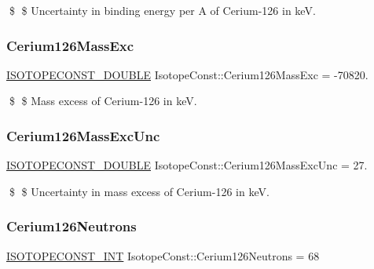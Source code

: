 \$ \$ Uncertainty in binding energy per A of Cerium-\/126 in keV. \mbox{\label{group___isotope_const-_cerium-_ce126_ga34e0b01c910c09c519913cc8c7d53665}} 
\subsubsection{\texorpdfstring{Cerium126\+Mass\+Exc}{Cerium126MassExc}}
{\footnotesize\ttfamily \mbox{\hyperlink{group___isotope_const-_macros_ga8f45a7272ce02c0b4c65c44636ed719a}{I\+S\+O\+T\+O\+P\+E\+C\+O\+N\+S\+T\+\_\+\+D\+O\+U\+B\+LE}} Isotope\+Const\+::\+Cerium126\+Mass\+Exc = -\/70820.}

\$ \$ Mass excess of Cerium-\/126 in keV. \mbox{\label{group___isotope_const-_cerium-_ce126_ga19361bccce5c1f1f04e64427d04d6c84}} 
\subsubsection{\texorpdfstring{Cerium126\+Mass\+Exc\+Unc}{Cerium126MassExcUnc}}
{\footnotesize\ttfamily \mbox{\hyperlink{group___isotope_const-_macros_ga8f45a7272ce02c0b4c65c44636ed719a}{I\+S\+O\+T\+O\+P\+E\+C\+O\+N\+S\+T\+\_\+\+D\+O\+U\+B\+LE}} Isotope\+Const\+::\+Cerium126\+Mass\+Exc\+Unc = 27.}

\$ \$ Uncertainty in mass excess of Cerium-\/126 in keV. \mbox{\label{group___isotope_const-_cerium-_ce126_ga03dabde6385c4837b84af619f3691e00}} 
\subsubsection{\texorpdfstring{Cerium126\+Neutrons}{Cerium126Neutrons}}
{\footnotesize\ttfamily \mbox{\hyperlink{group___isotope_const-_macros_ga5f18360b3e99483a35c32d789e62621c}{I\+S\+O\+T\+O\+P\+E\+C\+O\+N\+S\+T\+\_\+\+I\+NT}} Isotope\+Const\+::\+Cerium126\+Neutrons = 68}

